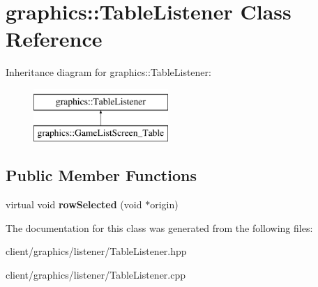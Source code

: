 \hypertarget{classgraphics_1_1_table_listener}{\section{graphics\-:\-:Table\-Listener Class Reference}
\label{classgraphics_1_1_table_listener}
}
Inheritance diagram for graphics\-:\-:Table\-Listener\-:\begin{figure}[H]
\begin{center}
\leavevmode
\includegraphics[height=2.000000cm]{classgraphics_1_1_table_listener}
\end{center}
\end{figure}
\subsection*{Public Member Functions}
\begin{DoxyCompactItemize}
\item 
\hypertarget{classgraphics_1_1_table_listener_a9de0502f83aad54a59da9f28f808288d}{virtual void {\bfseries row\-Selected} (void $\ast$origin)}\label{classgraphics_1_1_table_listener_a9de0502f83aad54a59da9f28f808288d}

\end{DoxyCompactItemize}


The documentation for this class was generated from the following files\-:\begin{DoxyCompactItemize}
\item 
client/graphics/listener/Table\-Listener.\-hpp\item 
client/graphics/listener/Table\-Listener.\-cpp\end{DoxyCompactItemize}
